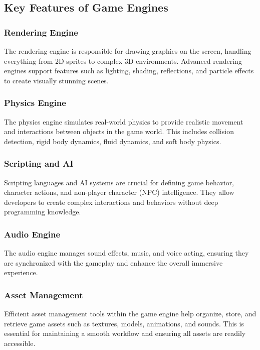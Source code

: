 \subsection*{Key Features of Game Engines}

\subsubsection*{Rendering Engine}
The rendering engine is responsible for drawing graphics on the screen, handling everything from 2D sprites to complex 3D environments. Advanced rendering engines support features such as lighting, shading, reflections, and particle effects to create visually stunning scenes.

\subsubsection*{Physics Engine}
The physics engine simulates real-world physics to provide realistic movement and interactions between objects in the game world. This includes collision detection, rigid body dynamics, fluid dynamics, and soft body physics.

\subsubsection*{Scripting and AI}
Scripting languages and AI systems are crucial for defining game behavior, character actions, and non-player character (NPC) intelligence. They allow developers to create complex interactions and behaviors without deep programming knowledge.

\subsubsection*{Audio Engine}
The audio engine manages sound effects, music, and voice acting, ensuring they are synchronized with the gameplay and enhance the overall immersive experience.

\subsubsection*{Asset Management}
Efficient asset management tools within the game engine help organize, store, and retrieve game assets such as textures, models, animations, and sounds. This is essential for maintaining a smooth workflow and ensuring all assets are readily accessible.


\pagebreak


